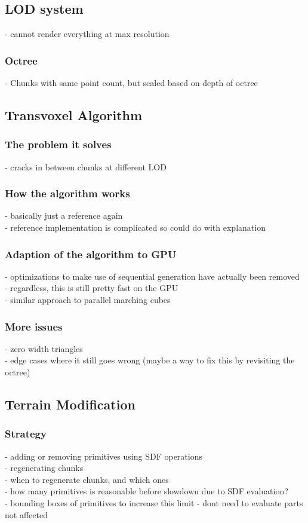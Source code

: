 \documentclass{article}
\begin{document}
\subsection{LOD system}
 - cannot render everything at max resolution
\subsubsection{Octree}
 - Chunks with same point count, but scaled based on depth of octree

\subsection{Transvoxel Algorithm}
\subsubsection{The problem it solves}
 - cracks in between chunks at different LOD
\subsubsection{How the algorithm works}
 - basically just a reference again\\
 - reference implementation is complicated so could do with explanation
\subsubsection{Adaption of the algorithm to GPU}
 - optimizations to make use of sequential generation have actually been removed\\
 - regardless, this is still pretty fast on the GPU\\
 - similar approach to parallel marching cubes\\
\subsubsection{More issues}
- zero width triangles\\
- edge cases where it still goes wrong (maybe a way to fix this by revisiting the octree)\\

\subsection{Terrain Modification}
\subsubsection{Strategy}
 - adding or removing primitives using SDF operations\\
 - regenerating chunks\\
 - when to regenerate chunks, and which ones\\
 - how many primitives is reasonable before slowdown due to SDF evaluation?\\
 - bounding boxes of primitives to increase this limit - dont need to evaluate parts not affected\\
 
\end{document}
